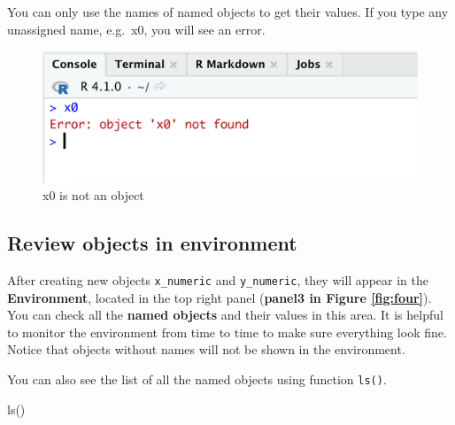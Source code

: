 \documentclass[
]{book}
\newenvironment{Shaded}{\begin{snugshade}}{\end{snugshade}}
\newcommand{\FunctionTok}[1]{\textcolor[rgb]{0.00,0.00,0.00}{#1}}
\newcommand{\NormalTok}[1]{#1}
\newenvironment{infobox}[1]
  {
  \begin{itemize}
  \renewcommand{\labelitemi}{
    \raisebox{-.7\height}[0pt][0pt]{
      {\setkeys{Gin}{width=3em,keepaspectratio}
        \texttt{[image: pics/\#1]}}
    }
  }
  \setlength{\fboxsep}{1em}
  \begin{blackbox}
  \item
  }
  {
  \end{blackbox}
  \end{itemize}
  }
\newenvironment{blackbox}{
  \definecolor{shadecolor}{rgb}{0, 0, 0}  %
  \color{white}
  \begin{shaded}}
 {\end{shaded}}
\begin{document}
\begin{infobox}{caution}

You can only use the names of named objects to get their values. If you type any unassigned name, e.g.~x0, you will see an error.



\end{infobox}
\begin{figure}

{\centering \includegraphics[width=0.8\linewidth]{pics/2object} 

}

\caption{x0 is not an object}\label{fig:obj}
\end{figure}
\hypertarget{review-objects-in-environment}{%
\subsection{Review objects in environment}\label{review-objects-in-environment}}

After creating new objects \texttt{x\_numeric} and \texttt{y\_numeric}, they will appear in the \textbf{Environment}, located in the top right panel (\textbf{panel3 in Figure \ref{fig:four}}). You can check all the \textbf{named objects} and their values in this area. It is helpful to monitor the environment from time to time to make sure everything look fine. Notice that objects without names will not be shown in the environment.

You can also see the list of all the named objects using function \texttt{ls()}.

\begin{Shaded}
\begin{Highlighting}[]
\FunctionTok{ls}\NormalTok{()}
\end{Highlighting}
\end{Shaded}
\end{document}

